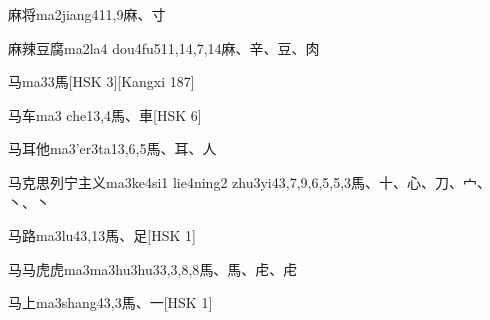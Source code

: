 \begin{EntryWithPhonetic}{麻将}{ma2jiang4}{11,9}{⿇、⼨}
\end{EntryWithPhonetic}

\begin{EntryWithPhonetic}{麻辣豆腐}{ma2la4 dou4fu5}{11,14,7,14}{⿇、⾟、⾖、⾁}
\end{EntryWithPhonetic}

\begin{EntryWithPhonetic}{马}{ma3}{3}{⾺}[HSK 3][Kangxi 187]
\end{EntryWithPhonetic}

\begin{EntryWithPhonetic}{马车}{ma3 che1}{3,4}{⾺、⾞}[HSK 6]
\end{EntryWithPhonetic}

\begin{EntryWithPhonetic}{马耳他}{ma3'er3ta1}{3,6,5}{⾺、⽿、⼈}
\end{EntryWithPhonetic}

\begin{EntryWithPhonetic}{马克思列宁主义}{ma3ke4si1 lie4ning2 zhu3yi4}{3,7,9,6,5,5,3}{⾺、⼗、⼼、⼑、⼧、⼂、⼂}
\end{EntryWithPhonetic}

\begin{EntryWithPhonetic}{马路}{ma3lu4}{3,13}{⾺、⾜}[HSK 1]
\end{EntryWithPhonetic}

\begin{EntryWithPhonetic}{马马虎虎}{ma3ma3hu3hu3}{3,3,8,8}{⾺、⾺、⾌、⾌}
\end{EntryWithPhonetic}

\begin{EntryWithPhonetic}{马上}{ma3shang4}{3,3}{⾺、⼀}[HSK 1]
\end{EntryWithPhonetic}


